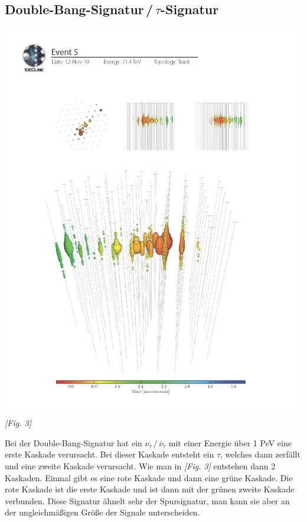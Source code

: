 \subsection{Double-Bang-Signatur\,/\,$\tau$-Signatur}
\begin{center}
    \includegraphics[scale=0.45]{images/doublebang.png} \\
    \textit{[Fig. 3]}
\end{center}
Bei der Double-Bang-Signatur hat ein $\nu_\tau \,/\, \overline{\nu}_\tau$ mit einer Energie über 1 PeV eine erste Kaskade verursacht.
Bei dieser Kaskade entsteht ein $\tau$, welches dann zerfällt und eine zweite Kaskade verursacht.
Wie man in \textit{[Fig. 3]} entstehen dann 2 Kaskaden. Einmal gibt es eine rote Kaskade und dann eine grüne Kaskade.
Die rote Kaskade ist die erste Kaskade und ist dann mit der grünen zweite Kaskade verbunden. Diese Signatur ähnelt
sehr der Spursignatur, man kann sie aber an der ungleichmäßigen Größe der Signale unterscheiden. \cite{Halzen2012}